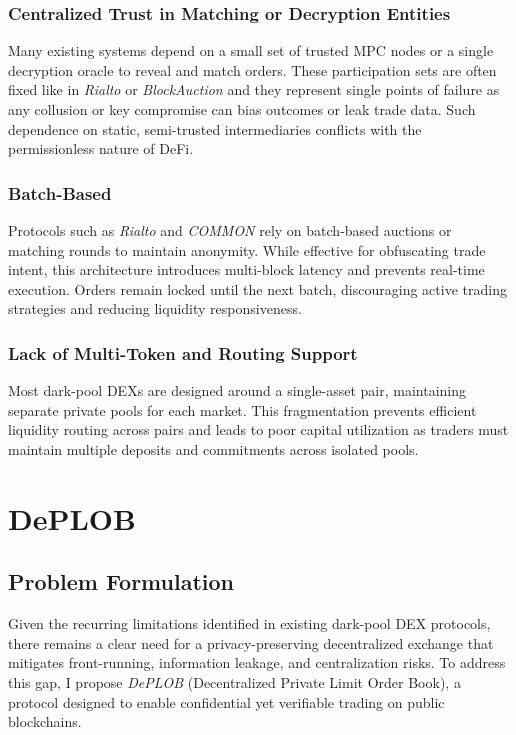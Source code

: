 \documentclass[12pt,a4paper]{article}
\begin{document}
\subsubsection{Centralized Trust in Matching or Decryption Entities}
Many existing systems depend on a small set of trusted MPC nodes or a single decryption oracle to reveal and match orders. These participation sets are often fixed like in \textit{Rialto} or \textit{BlockAuction} and they represent single points of failure as any collusion or key compromise can bias outcomes or leak trade data. Such dependence on static, semi-trusted intermediaries conflicts with the permissionless nature of DeFi.

\subsubsection{Batch-Based}
Protocols such as \textit{Rialto} and \textit{COMMON} rely on batch-based auctions or matching rounds to maintain anonymity. While effective for obfuscating trade intent, this architecture introduces multi-block latency and prevents real-time execution. Orders remain locked until the next batch, discouraging active trading strategies and reducing liquidity responsiveness. 

\subsubsection{Lack of Multi-Token and Routing Support}
Most dark-pool DEXs are designed around a single-asset pair, maintaining separate private pools for each market. This fragmentation prevents efficient liquidity routing across pairs and leads to poor capital utilization as traders must maintain multiple deposits and commitments across isolated pools.

\section{DePLOB}
\subsection{Problem Formulation}
Given the recurring limitations identified in existing dark-pool DEX protocols, there remains a clear need for a privacy-preserving decentralized exchange that mitigates front-running, information leakage, and centralization risks. To address this gap, I propose \textit{DePLOB} (Decentralized Private Limit Order Book), a protocol designed to enable confidential yet verifiable trading on public blockchains. 
\end{document}
